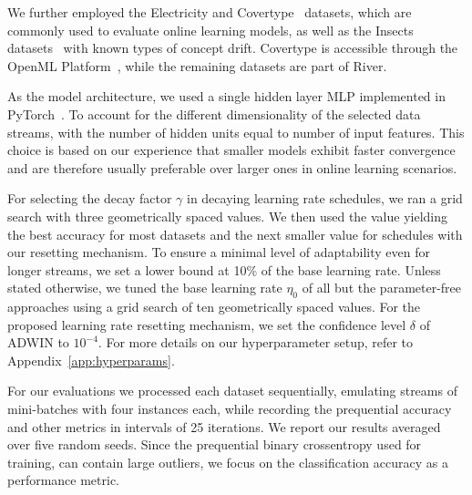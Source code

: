 \documentclass[letterpaper]{article} %
\begin{document}
We further employed the Electricity and Covertype~\cite{misc_covertype_31} datasets, which are commonly used to evaluate online learning models, as well as the Insects datasets~\cite{souzaChallengesBenchmarkingStream2020} with known types of concept drift.
Covertype is accessible through the OpenML Platform~\cite{vanschorenOpenMLNetworkedScience2014}, while the remaining datasets are part of River.

As the model architecture, we used a single hidden layer MLP implemented in PyTorch~\cite{paszkePyTorchImperativeStyle2019}.
To account for the different dimensionality of the selected data streams, with the number of hidden units equal to number of input features.
This choice is based on our experience that smaller models exhibit faster convergence and are therefore usually preferable over larger ones in online learning scenarios.

For selecting the decay factor $\gamma$ in decaying learning rate schedules, we ran a grid search with three geometrically spaced values.
We then used the value yielding the best accuracy for most datasets and the next smaller value for schedules with our resetting mechanism.
To ensure a minimal level of adaptability even for longer streams, we set a lower bound at 10\% of the base learning rate.
Unless stated otherwise, we tuned the base learning rate $\eta_0$ of all but the parameter-free approaches using a grid search of ten geometrically spaced values.
For the proposed learning rate resetting mechanism, we set the confidence level $\delta$ of ADWIN to $10^{-4}$.
For more details on our hyperparameter setup, refer to Appendix~\ref{app:hyperparams}.

For our evaluations we processed each dataset sequentially, emulating streams of mini-batches with four instances each, while recording the prequential accuracy and other metrics in intervals of 25 iterations.
We report our results averaged over five random seeds.
Since the prequential binary crossentropy used for training, can contain large outliers, we focus on the classification accuracy as a performance metric.
\end{document}
